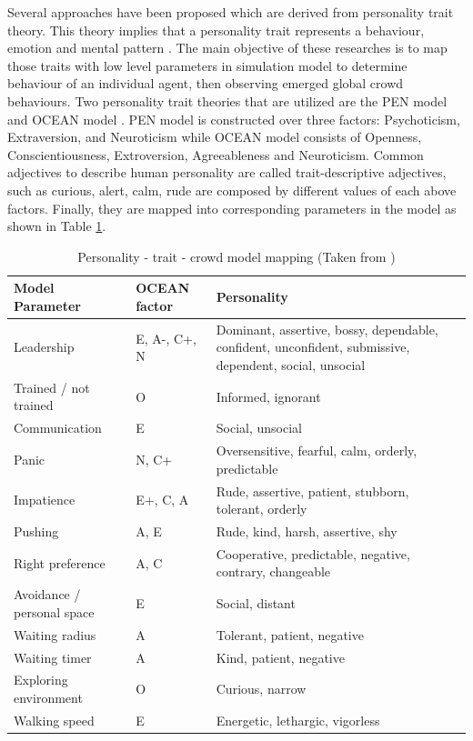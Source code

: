 Several approaches have been proposed which are derived from personality trait theory. This theory implies that a personality trait represents a behaviour, emotion and mental pattern \citep{Durupinar2008}. The main objective of these researches is to map those traits with low level parameters in simulation model to determine behaviour of an individual agent, then observing emerged global crowd behaviours. Two personality trait theories that are utilized are the PEN model \citep{Guy2011} and OCEAN model \citep{Durupinar2008,Durupinar2011}. PEN model is constructed over three factors: Psychoticism, Extraversion, and Neuroticism while OCEAN model consists of Openness, Conscientiousness, Extroversion, Agreeableness and Neuroticism. Common adjectives to describe human personality are called trait-descriptive adjectives, such as curious, alert, calm, rude are composed by different values of each above factors. Finally, they are mapped into corresponding parameters in the model as shown in Table \ref{table:oceanPersonality}.

\begin{table}
	\caption{Personality - trait - crowd model mapping (Taken from \citet{Durupinar2008})}
	\label{table:oceanPersonality}
	\centering
	\begin{tabular}{|l|l|p{6.5cm}|}
		\hline
		\textbf{Model Parameter} & \textbf{OCEAN factor} & \textbf{Personality} \\
		\hline
		Leadership & E, A-, C+, N & Dominant, assertive, bossy, dependable, confident, unconfident, submissive, dependent, social, unsocial \\
		\hline
		Trained / not trained & O & Informed, ignorant \\
		\hline
		Communication & E & Social, unsocial \\
		\hline
		Panic & N, C+ & Oversensitive, fearful, calm, orderly, predictable \\
		\hline
		Impatience & E+, C, A & Rude, assertive, patient, stubborn, tolerant, orderly \\
		\hline
		Pushing & A, E & Rude, kind, harsh, assertive, shy \\
		\hline
		Right preference & A, C & Cooperative, predictable, negative, contrary, changeable \\
		\hline
		Avoidance / personal space & E & Social, distant \\
		\hline
		Waiting radius & A & Tolerant, patient, negative \\
		\hline
		Waiting timer & A & Kind, patient, negative \\
		\hline
		Exploring environment & O & Curious, narrow \\
		\hline
		Walking speed & E & Energetic, lethargic, vigorless \\
		\hline
	\end{tabular}
\end{table}

